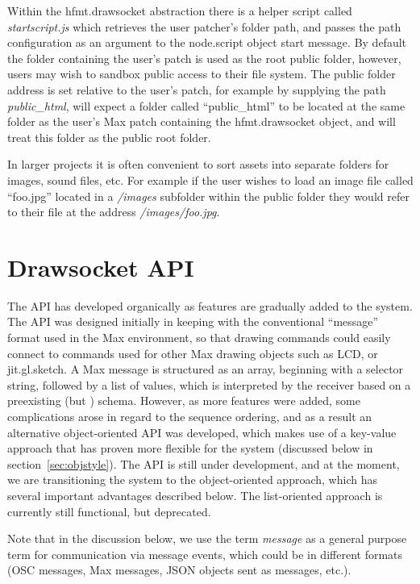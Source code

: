 Within the hfmt.drawsocket abstraction there is a helper script called \textit{startscript.js} which retrieves the user patcher's folder path, and passes the path configuration as an argument to the node.script object start message. 
By default the folder containing the user's patch is used as the root public folder, however, users may wish to sandbox public access to their file system.
The public folder address is set relative to the user's patch, for example by supplying the path \textit{public\_html}, \drawsocket will expect a folder called ``public\_html'' to be located at the same folder as the user's Max patch containing the hfmt.drawsocket object, and will treat this folder as the public root folder.

In larger projects it is often convenient to sort assets into separate folders for images, sound files, etc. For example if the user wishes to load an image file called ``foo.jpg'' located in a \textit{/images} subfolder within the public folder they would refer to their file at the address \textit{/images/foo.jpg}.

\section{Drawsocket API}\label{sec:api}
The \drawsocket API has developed organically as features are gradually added to the system.
The API was designed initially in keeping with the conventional ``message'' format used in the Max environment, so that drawing commands could easily connect to commands used for other Max drawing objects such as LCD, or jit.gl.sketch.
A Max message is structured as an array, beginning with a selector string, followed by a list of values, which is interpreted by the receiver based on a preexisting (but ) schema.
However, as more features were added, some complications arose in regard to the sequence ordering, and as a result an alternative object-oriented API was developed, which makes use of a key-value approach that has proven more flexible for the \drawsocket system (discussed below in section~\ref{sec:objstyle}).
The API is still under development, and at the moment, we are transitioning the system to the object-oriented approach, which has several important advantages described below. 
The list-oriented approach is currently still functional, but deprecated.

Note that in the discussion below, we use the term \textit{message} as a general purpose term for communication via message events, which could be in different formats (OSC messages, Max messages, JSON objects sent as messages, etc.).

